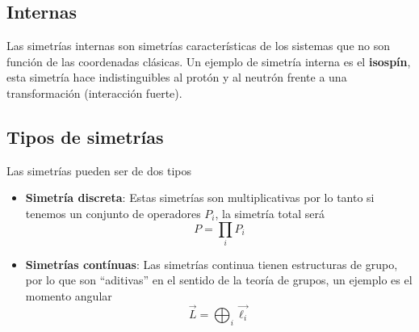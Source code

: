 \subsection{Internas}
Las simetrías internas son simetrías características de los sistemas que no son función de las coordenadas clásicas. Un ejemplo de simetría interna es el \textbf{isospín}, esta simetría hace indistinguibles al protón y al neutrón frente a una transformación (interacción fuerte).
\newpage
\subsection{Tipos de simetrías}
Las simetrías pueden ser de dos tipos
\begin{itemize}
    \item \textbf{Simetría discreta}: Estas simetrías son multiplicativas por lo tanto si tenemos un conjunto de 
    operadores $P_i$, la simetría total será $$P=\prod_i P_i$$
    \item \textbf{Simetrías contínuas}: Las simetrías continua tienen estructuras de grupo, por lo que son ``aditivas'' en el sentido de la teoría de grupos, un ejemplo es el momento angular $$\vec{L}=\bigoplus_i \vec{\ell_i}$$
\end{itemize}
